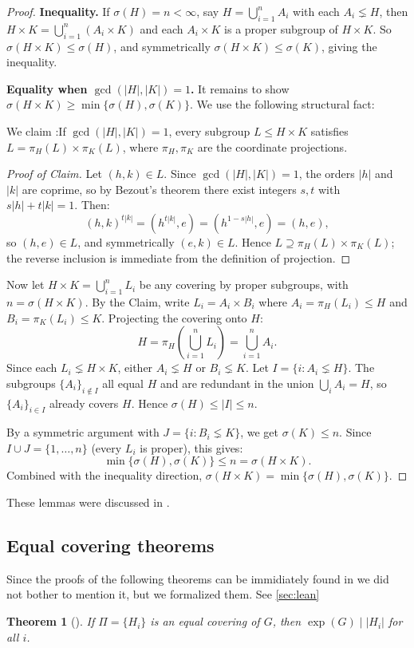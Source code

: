 \documentclass[12pt, a4paper]{article}
\theoremstyle{plain}
\newtheorem{theorem}{Theorem}[section]
\theoremstyle{definition}
\DeclareMathOperator{\Exp}{exp}
\begin{document}
\begin{proof}
\textbf{Inequality.}
If $\sigma(H) = n < \infty$, say $H = \bigcup_{i=1}^n A_i$ with each $A_i \lneq H$,
then $H \times K = \bigcup_{i=1}^n (A_i \times K)$ and each $A_i \times K$ is a
proper subgroup of $H \times K$. So $\sigma(H \times K) \leq \sigma(H)$, and
symmetrically $\sigma(H \times K) \leq \sigma(K)$, giving the inequality.

\medskip
\textbf{Equality when $\gcd(|H|,|K|) = 1$.}
It remains to show $\sigma(H \times K) \geq \min\{\sigma(H), \sigma(K)\}$.
We use the following structural fact:

We claim :If $\gcd(|H|,|K|) = 1$, every subgroup $L \leq H \times K$ satisfies
$L = \pi_H(L) \times \pi_K(L)$, where $\pi_H, \pi_K$ are the coordinate
projections.

\begin{proof}[Proof of Claim]
Let $(h, k) \in L$. Since $\gcd(|H|, |K|) = 1$, the orders $|h|$ and $|k|$
are coprime, so by Bezout's theorem there exist integers $s, t$ with
$s|h| + t|k| = 1$. Then:
\[
  (h, k)^{t|k|} = (h^{t|k|}, e) = (h^{1 - s|h|}, e) = (h, e),
\]
so $(h, e) \in L$, and symmetrically $(e, k) \in L$.
Hence $L \supseteq \pi_H(L) \times \pi_K(L)$; the reverse inclusion is
immediate from the definition of projection.
\end{proof}

Now let $H \times K = \bigcup_{i=1}^n L_i$ be any covering by proper subgroups,
with $n = \sigma(H \times K)$. By the Claim, write $L_i = A_i \times B_i$ where
$A_i = \pi_H(L_i) \leq H$ and $B_i = \pi_K(L_i) \leq K$. Projecting the
covering onto $H$:
\[
  H = \pi_H\!\left(\bigcup_{i=1}^n L_i\right) = \bigcup_{i=1}^n A_i.
\]
Since each $L_i \lneq H \times K$, either $A_i \lneq H$ or $B_i \lneq K$.
Let $I = \{i : A_i \lneq H\}$. The subgroups $\{A_i\}_{i \notin I}$ all equal
$H$ and are redundant in the union $\bigcup_i A_i = H$, so $\{A_i\}_{i \in I}$
already covers $H$. Hence $\sigma(H) \leq |I| \leq n$.

By a symmetric argument with $J = \{i : B_i \lneq K\}$, we get $\sigma(K) \leq n$.
Since $I \cup J = \{1, \ldots, n\}$ (every $L_i$ is proper), this gives:
\[
  \min\{\sigma(H), \sigma(K)\} \leq n = \sigma(H \times K).
\]
Combined with the inequality direction, $\sigma(H \times K) = \min\{\sigma(H),
\sigma(K)\}$.
\end{proof}

These lemmas were discussed in  \cite{cohn1994}.

\subsection{Equal covering theorems}
Since the proofs of the following theorems can be immidiately found in \cite{velasquez2022} we did not bother to mention it, but we formalized them. See \ref{sec:lean}
\begin{theorem}[{\cite[Theorem~13]{velasquez2022}}]
  \label{thm:exp}
  If $\Pi = \{H_i\}$ is an equal covering of $G$, then $\Exp(G) \mid |H_i|$ for all $i$.
\end{theorem}
\end{document}
